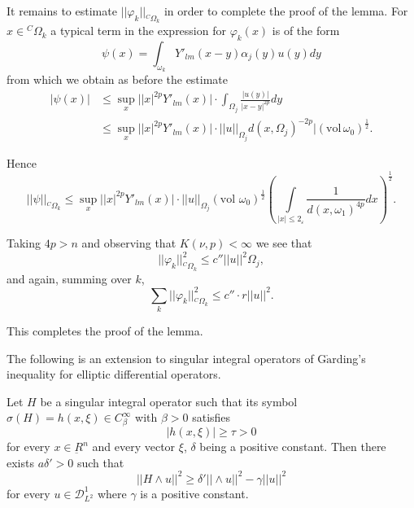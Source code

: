  It remains to estimate $ ||\varphi_k||_{{}^C\Omega_k} $
 in order to complete the proof of the lemma. For $x \in {}^C
 \Omega_k $ a typical term in the expression for $\varphi_k(x) $ is of
 the form  
 $$
 \psi (x) = \int_{\omega_k}Y'_{lm} (x-y) \alpha_{j} (y) u (y) dy 
 $$
 from which we obtain as before the estimate 
 \begin{align*}
 |\psi (x)| &  \leq \sup\limits_{x}\big|
 |x|^{2p}Y'_{lm}(x)\big| \cdot \int_{\Omega_j} \frac{|u(y) |}{|x-y|^{2p}}dy\\  
  & \leq \sup\limits_{x}\big| |x|^{2p}Y'_{lm}(x)
 \big| \cdot ||u||_{\Omega_j} d (x,\Omega_j )^{-2p}
 |(\text{vol}\,\omega_0)^{\frac{1}{2}}.   
 \end{align*}

Hence 
$$
||\psi||_{{}^C\Omega_k}\leq
\sup\limits_{x}\big| |x|^{2p}Y'_{lm}(x)\big| \cdot ||u||_{\Omega_j}
(\text{vol }\omega_0)^{\frac{1}{2}}(\int\limits_{|x|\leq 
  2_\varepsilon}\frac{1}{d(x,\omega_1)^{4p}} dx)^{\frac{1}{2}}. 
$$\pageoriginale

Taking $4p > n$ and observing that $K(\nu, p) < \infty$ we see that  
 $$
 ||\varphi_k||^2_{{}^C\Omega_k}\leq c''||u||^2 \Omega_j, 
 $$
and again, summing over $k$, 
 \begin{equation}
\sum_k || \varphi_k ||^2_{{}^C\Omega_k} \leq c'' \cdot  r||
u||^2. \tag{5.15}  \label{chap3-eq5.15}
 \end{equation} 

 This completes the proof of the lemma.
 
 The following is an extension to singular integral operators of
 G$\ring{\text{a}}$r\-ding's inequality for elliptic differential operators.  

\setcounter{proposition}{0} 
\begin{proposition}\label{chap3-sec5-prop1}%
Let $H$ be a singular integral operator such that its symbol
$\sigma(H) = h(x, \xi) \in C^\infty_\beta$ with $\beta > 0 $ 
satisfies  
 \begin{equation}
|h(x,\xi) |\geq \tau > 0 \tag{5.16}\label{chap3-eq5.16}
 \end{equation} 
 for every $x \in \underbar{R}^n $ and every vector $\xi$,
 $\delta$ being a positive constant. Then there exists $a \delta' >0$
 such that  
 \begin{equation}
||H \wedge u ||^2 \geq \delta' || \wedge u ||^2 - \gamma || u||^2
\tag{5.17} \label{chap3-eq5.17}
 \end{equation} 
 for every $u \in \mathscr{D}^1_{L^2} $ where $\gamma$ is a
 positive constant.  
 \end{proposition}

